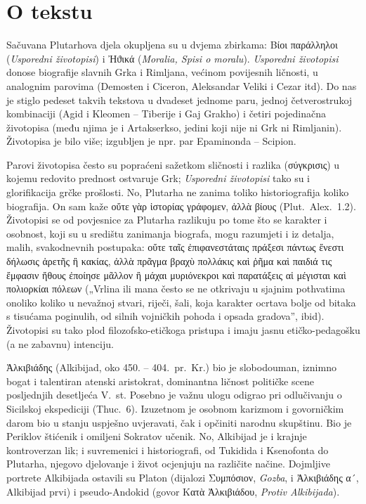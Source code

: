 
\section*{O tekstu}

Sačuvana Plutarhova djela okupljena su u dvjema zbirkama: Βίοι παράλληλοι (\textit{Usporedni životopisi}) i Ἠϑικά (\textit{Moralia, Spisi o moralu}). \textit{Usporedni životopisi} donose biografije slavnih Grka i Rimljana, većinom povijesnih ličnosti, u analognim parovima (Demosten i Ciceron, Aleksandar Veliki i Cezar itd). Do nas je stiglo pedeset takvih tekstova u dvadeset jednome paru, jednoj četverostrukoj kombinaciji (Agid i Kleomen – Tiberije i Gaj Grakho) i četiri pojedinačna životopisa (među njima je i Artakserkso, jedini koji nije ni Grk ni Rimljanin). Životopisa je bilo više; izgubljen je npr. par Epaminonda – Scipion.

Parovi životopisa često su popraćeni sažetkom sličnosti i razlika \textgreek[variant=ancient]{(σύγκρισις)} u kojemu redovito prednost ostvaruje Grk; \textit{Usporedni životopisi} tako su i glorifikacija grčke prošlosti. No, Plutarha ne zanima toliko historiografija koliko biografija. On sam kaže \textgreek[variant=ancient]{οὔτε γὰρ ἱστορίας γράφομεν, ἀλλὰ βίους} (Plut.\ Alex.~1.2). Životopisi se od povjesnice za Plutarha razlikuju po tome što se karakter i osobnost, koji su u središtu zanimanja biografa, mogu razumjeti i iz detalja, malih, svakodnevnih postupaka: \textgreek[variant=ancient]{οὔτε ταῖς ἐπιφανεστάταις πράξεσι πάντως ἔνεστι δήλωσις ἀρετῆς ἢ κακίας, ἀλλὰ πρᾶγμα βραχὺ πολλάκις καὶ ῥῆμα καὶ παιδιά τις ἔμφασιν ἤθους ἐποίησε μᾶλλον ἢ μάχαι μυριόνεκροι καὶ παρατάξεις αἱ μέγισται καὶ πολιορκίαι πόλεων} („Vrlina ili mana često se ne otkrivaju u sjajnim pothvatima onoliko koliko u nevažnoj stvari, riječi, šali, koja karakter ocrtava bolje od bitaka s tisućama poginulih, od silnih vojničkih pohoda i opsada gradova”, ibid). Životopisi su tako plod filozofsko-etičkoga pristupa i imaju jasnu etičko-pedagošku (a ne zabavnu) intenciju. 

Ἀλκιβιάδης (Alkibijad, oko 450. – 404.\ pr.~Kr.) bio je slobodouman, iznimno bogat i talentiran atenski aristokrat, dominantna ličnost političke scene posljednjih desetljeća V.\ st. Posebno je važnu ulogu odigrao pri odlučivanju o Sicilskoj ekspediciji (Thuc.~6). Izuzetnom je osobnom karizmom i govorničkim darom bio u stanju uspješno uvjeravati, čak i opčiniti narodnu skupštinu. Bio je Periklov štićenik i omiljeni Sokratov učenik. No, Alkibijad je i krajnje kontroverzan lik; i suvremenici i historiografi, od Tukidida i Ksenofonta do Plutarha, njegovo djelovanje i život ocjenjuju na različite načine. Dojmljive portrete Alkibijada ostavili su Platon (dijalozi \textgreek[variant=ancient]{Συμπόσιον,} \textit{Gozba}, i \textgreek{Ἀλκιβιάδης α´,} Alkibijad prvi) i pseudo-Andokid (govor \textgreek[variant=ancient]{Κατὰ Ἀλκιβιάδου,} \textit{Protiv Alkibijada}).


